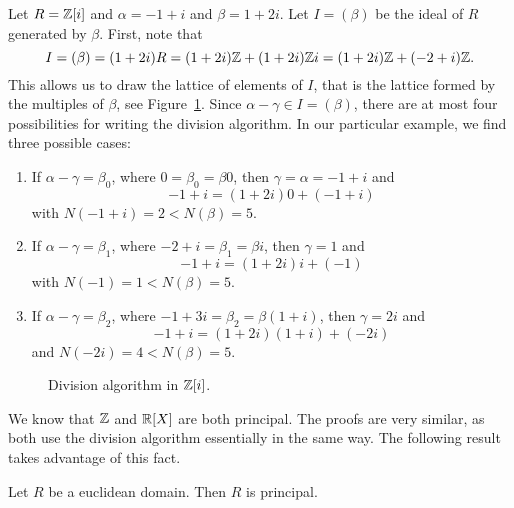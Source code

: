 \begin{example}
	Let $R=\mathbb{Z}[i]$ and 
	$\alpha=-1+i$ and $\beta=1+2i$. Let $I=(\beta)$ be the ideal of $R$ generated by $\beta$. 
	First, note that
	\[
	I=(\beta)=(1+2i)R=(1+2i)\mathbb{Z}+(1+2i)\mathbb{Z} i=(1+2i)\mathbb{Z}+(-2+i)\mathbb{Z}.
	\]  
	This allows us to draw the lattice of elements of $I$, 
	that is the lattice formed by the multiples of $\beta$, see Figure~\ref{fig:Z[i]}. 
	Since $\alpha-\gamma\in I=(\beta)$, there are at most four possibilities for writing
	the division algorithm. 
	In our particular example, we find three possible cases:
	\begin{enumerate}
		\item If $\alpha-\gamma=\beta_0$, where $0=\beta_0=\beta 0$, 
			then $\gamma=\alpha=-1+i$ and 
				\[
				-1+i=(1+2i)0+(-1+i)
				\]
				with $N(-1+i)=2<N(\beta)=5$. 
		\item If $\alpha-\gamma=\beta_1$, where $-2+i=\beta_1=\beta i$, then 
			$\gamma=1$ and 
			\[
			-1+i=(1+2i)i+(-1)
			\]
			with $N(-1)=1<N(\beta)=5$. 
		\item If $\alpha-\gamma=\beta_2$, where $-1+3i=\beta_2=\beta (1+i)$, 
			then $\gamma=2i$ and  
			\[
			-1+i=(1+2i)(1+i)+(-2i)
			\]
			and $N(-2i)=4<N(\beta)=5$. 
	\end{enumerate}
\end{example}

\begin{figure}
\caption{Division algorithm in $\mathbb{Z}[i]$.}
\label{fig:Z[i]}
\end{figure}

We know that $\mathbb{Z}$ and $\mathbb{R}[X]$ are both principal. The proofs 
are very similar, as both use the division algorithm essentially in the same way. 
The following result takes advantage of this fact. 

\begin{proposition}
	Let $R$ be a euclidean domain. Then $R$ is principal.	
\end{proposition}

